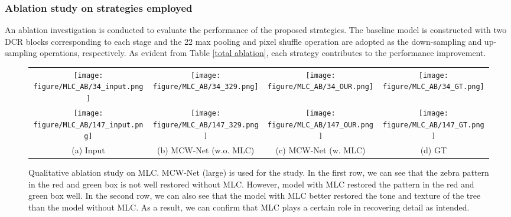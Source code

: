 \documentclass[a4paper,fleqn]{cas-dc}
\begin{document}
\subsubsection{Ablation study on strategies employed} 
An ablation investigation is conducted to evaluate the performance of the proposed strategies. The baseline model is constructed with two DCR blocks corresponding to each stage and the 22 max pooling and pixel shuffle operation are adopted as the down-sampling and up-sampling operations, respectively. As evident from Table \ref{total ablation}, each strategy contributes to the performance improvement.



\begin{figure*}[!t]\footnotesize
	\centering
	\setlength{\tabcolsep}{0pt}
	
	\begin{tabular}{cclcclcclccl}
	    \multicolumn{3}{c}{\texttt{[image: figure/MLC\_AB/34\_input.png]}} &
		\multicolumn{3}{c}{\texttt{[image: figure/MLC\_AB/34\_329.png]}} &
		\multicolumn{3}{c}{\texttt{[image: figure/MLC\_AB/34\_OUR.png]}} &
		\multicolumn{3}{c}{\texttt{[image: figure/MLC\_AB/34\_GT.png]}}
		\\
		\multicolumn{3}{c}{\texttt{[image: figure/MLC\_AB/147\_input.png]}} &
		\multicolumn{3}{c}{\texttt{[image: figure/MLC\_AB/147\_329.png]}} &
		\multicolumn{3}{c}{\texttt{[image: figure/MLC\_AB/147\_OUR.png]}} &
		\multicolumn{3}{c}{\texttt{[image: figure/MLC\_AB/147\_GT.png]}}
		\\
		\multicolumn{3}{c}{(a) {Input}} &
		\multicolumn{3}{c}{(b) {MCW-Net (w.o. MLC)}} &
		\multicolumn{3}{c}{(c) {MCW-Net (w. MLC)}} &
		\multicolumn{3}{c}{(d) {GT}}
	\end{tabular}
	\caption{Qualitative ablation study on MLC. MCW-Net (large) is used for the study. In the first row, we can see that the zebra pattern in the red and green box is not well restored without MLC. However, model with MLC restored the pattern in the red and green box well. In the second row, we can also see that the model with MLC better restored the tone and texture of the tree than the model without MLC. As a result, we can confirm that MLC plays a certain role in recovering detail as intended.}

	\label{fig:mlc_ablation}
\end{figure*}
\end{document}
